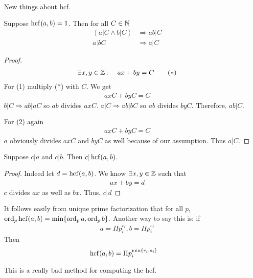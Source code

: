 New things about hcf.
\begin{lm}
Suppose $\operatorname{hcf}(a,b)= 1$. Then for all $C \in \mathbb N$
\begin{align*}
(a|C \wedge b|C) & \Rightarrow ab|C \tag{1}\\
a|bC & \Rightarrow a|C \tag{2}
\end{align*}
\end{lm}
\begin{proof}
\begin{align*}
\exists x,y \in \mathbb Z:	\quad ax+by=C \tag{$*$}
\end{align*}
For (1) multiply ($*$) with $C$. We get
\begin{align*}
axC + byC = C
\end{align*}
$b|C \Rightarrow ab|aC$ so $ab$ divides $axC$. $a|C \Rightarrow ab|bC$ so $ab$ divides $byC$. Therefore, $ab | C$.

For (2) again
\begin{align*}
axC+byC = C
\end{align*}
$a$ obviously divides $axC$ and $byC$ as well because of our assumption. Thus $a|C$.
\end{proof}

\begin{tm}
Suppose $c|a$ and $c|b$. Then $c|\operatorname{hcf}(a,b)$.
\end{tm}

\begin{proof}
Indeed let $d = \operatorname{hcf}(a,b)$. We know $\exists x,y \in \mathbb Z$ such that
\begin{align*}
ax+by=d
\end{align*}
$c$ divides $ax$ as well as $bx$. Thus, $c|d$
\end{proof}
It follows easily from unique prime factorization that for all $p$, $\operatorname{ord}_p \operatorname{hcf}(a,b) = \min \{ \operatorname{ord}_p a, \operatorname{ord}_p b \}$.
Another way to say this is: if 
\begin{align*}
a  = \Pi p_i^{r_i}, b  = \Pi p_i ^{s_i} 
\end{align*}
Then
\begin{align*}
\operatorname{hcf}(a,b) & = \Pi p_i^{\min\{r_i,s_i\}}
\end{align*}

\begin{rk}
This is a really bad method for computing the hcf.
\end{rk}

